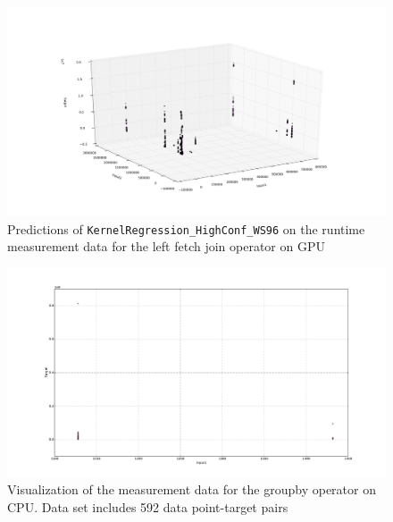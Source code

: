 \begin{figure}[htbp]
  \centering
    \includegraphics[width=\linewidth]{./Figures/kreg_ws96_ocl_leftfetchjoin_on_gpu}
  \caption{Predictions of \texttt{KernelRegression\_HighConf\_WS96} on the runtime measurement data for the left fetch join operator on GPU}
  \label{kreg_ws96_ocl_leftfetchjoin_on_gpu}
\end{figure}

\begin{figure}[htbp]
  \centering
    \includegraphics[width=\linewidth]{./Figures/ref_ocl_groupby_on_device_on_cpu.pdf}
  \caption{Visualization of the measurement data for the groupby operator on CPU. Data set includes 592 data point-target pairs}
  \label{ref_ocl_groupby_on_device_on_cpu}
\end{figure}

